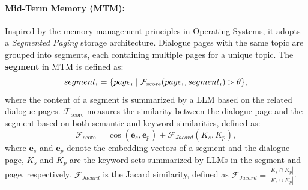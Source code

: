 \documentclass[11pt]{article}
\begin{document}




\paragraph{Mid-Term Memory (MTM):} Inspired by the memory management principles in Operating Systems, it adopts a \emph{Segmented Paging} storage architecture. 
Dialogue pages with the same topic are grouped into segments, each containing multiple pages for a unique topic. The \textbf{segment} in MTM is defined as:
\begin{equation}
\small
\label{eq:insert}
segment_i = \{page_i \mid \mathcal{F}_{\text{score}}(page_i,segment_i) > \theta \},
\end{equation}
where the content of a segment is summarized by a LLM based on the related dialogue pages.  $\mathcal{F}_{\text{score}}$ measures the similarity between the dialogue page and the segment based on both semantic and keyword similarities, defined as: 
    \begin{equation}
        \mathcal{F}_\text{score} = \cos(\mathbf{e}_s, \mathbf{e}_p) + \mathcal{F}_{Jacard}(K_s, K_p),
    \label{eq:sim}
    \end{equation}
where $\mathbf{e}_s$ and $\mathbf{e}_p$ denote the embedding vectors of a segment and the dialogue page, $K_s$ and $K_p$ are the keyword sets summarized by LLMs in the segment and page, respectively.  $\mathcal{F}_{Jacard}$  is the Jacard similarity, defined as $\mathcal{F}_{Jacard} = \frac{|K_s \cap K_p|}{|K_s \cup K_p|}$.
\end{document}
